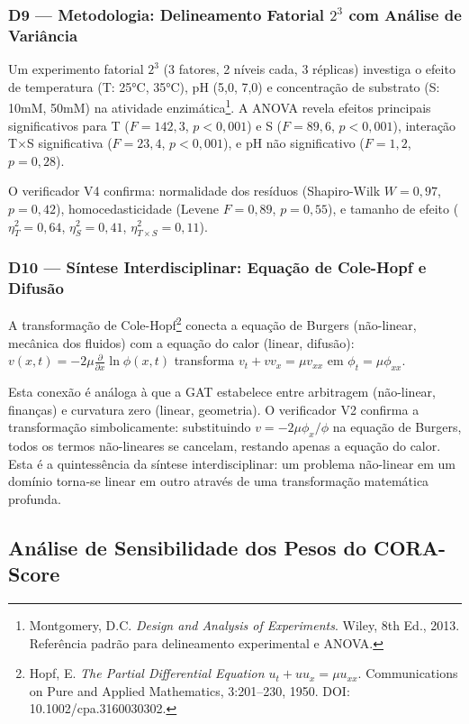 \subsubsection{D9 — Metodologia: Delineamento Fatorial $2^3$ com Análise de Variância}

Um experimento fatorial $2^3$ (3 fatores, 2 níveis cada, 3 réplicas) investiga
o efeito de temperatura (T: 25°C, 35°C), pH (5,0, 7,0) e concentração de
substrato (S: 10mM, 50mM) na atividade enzimática\footnote{Montgomery, D.C.
\textit{Design and Analysis of Experiments}. Wiley, 8th Ed., 2013. Referência
padrão para delineamento experimental e ANOVA.}. A ANOVA revela efeitos
principais significativos para T ($F = 142,3$, $p < 0,001$) e S ($F = 89,6$,
$p < 0,001$), interação T$\times$S significativa ($F = 23,4$, $p < 0,001$),
e pH não significativo ($F = 1,2$, $p = 0,28$).

O verificador V4 confirma: normalidade dos resíduos (Shapiro-Wilk $W = 0,97$,
$p = 0,42$), homocedasticidade (Levene $F = 0,89$, $p = 0,55$), e tamanho de
efeito ($\eta^2_T = 0,64$, $\eta^2_S = 0,41$, $\eta^2_{T\times S} = 0,11$).

\subsubsection{D10 — Síntese Interdisciplinar: Equação de Cole-Hopf e Difusão}

A transformação de Cole-Hopf\footnote{Hopf, E. \textit{The Partial Differential
Equation $u_t + uu_x = \mu u_{xx}$}. Communications on Pure and Applied
Mathematics, 3:201--230, 1950. DOI: 10.1002/cpa.3160030302.} conecta a equação
de Burgers (não-linear, mecânica dos fluidos) com a equação do calor (linear,
difusão): $v(x,t) = -2\mu\frac{\partial}{\partial x}\ln\phi(x,t)$ transforma
$v_t + vv_x = \mu v_{xx}$ em $\phi_t = \mu\phi_{xx}$.

Esta conexão é análoga à que a GAT estabelece entre arbitragem (não-linear,
finanças) e curvatura zero (linear, geometria). O verificador V2 confirma a
transformação simbolicamente: substituindo $v = -2\mu\phi_x/\phi$ na equação
de Burgers, todos os termos não-lineares se cancelam, restando apenas a equação
do calor. Esta é a quintessência da síntese interdisciplinar: um problema
não-linear em um domínio torna-se linear em outro através de uma transformação
matemática profunda.

\subsection{Análise de Sensibilidade dos Pesos do CORA-Score}

